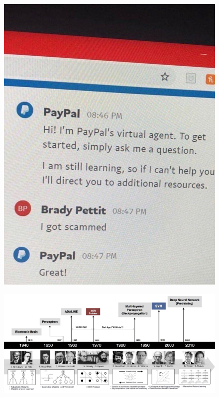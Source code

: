 \documentclass[10pt, compress]{beamer}
\begin{document}
\begin{frame}
  \vspace{.3cm}
  \begin{figure}
    \includegraphics[width=.6\linewidth]{imgs/funny_2}
  \end{figure}
\end{frame}

\begin{frame}
\begin{figure}
  \includegraphics[width=1\linewidth]{imgs/nn_timeline}
\end{figure}
\end{frame}
\end{document}
